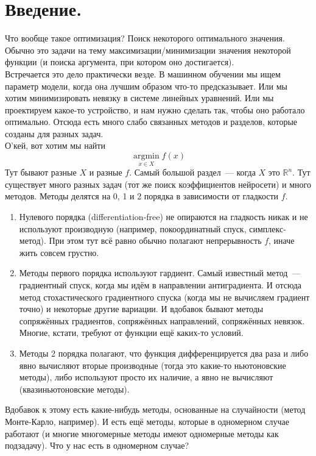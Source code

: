 \documentclass{article}
\begin{document}
    \section{Введение.}
    Что вообще такое оптимизация? Поиск некоторого оптимального значения. Обычно это задачи на тему максимизации/минимизации значения некоторой функции (и поиска аргумента, при котором оно достигается).\\
    Встречается это дело практически везде. В машинном обучении мы ищем параметр модели, когда она лучшим образом что-то предсказывает. Или мы хотим минимизировать невязку в системе линейных уравнений. Или мы проектируем какое-то устройство, и нам нужно сделать так, чтобы оно работало оптимально. Отсюда есть много слабо связанных методов и разделов, которые созданы для разных задач.\\
    О'кей, вот хотим мы найти
    $$
    \operatorname*{argmin}_{x\in X}f(x)
    $$
    Тут бывают разные $X$ и разные $f$. Самый большой раздел~--- когда $X$ это $\mathbb R^n$. Тут существует много разных задач (тот же поиск коэффициентов нейросети) и много методов. Методы делятся на 0, 1 и 2 порядка в зависимости от гладкости $f$.
    \begin{enumerate}[1.]
        \addtocounter{enumi}{-1}
        \item Нулевого порядка (differentiation-free) не опираются на гладкость никак и не используют производную (например, покоординатный спуск, симплекс-метод). При этом тут всё равно обычно полагают непрерывность $f$, иначе жить совсем грустно.
        \item Методы первого порядка используют гардиент. Самый известный метод~--- градиентный спуск, когда мы идём в направлении антиградиента. И отсюда метод стохастического градиентного спуска (когда мы не вычисляем градиент точно) и некоторые другие вариации. И вдобавок бывают методы сопряжённых градиентов, сопряжённых направлений, сопряжённых невязок. Многие, кстати, требуют от функции ещё каких-то условий.
        \item Методы 2 порядка полагают, что функция дифференцируется два раза и либо явно вычисляют вторые производные (тогда это какие-то ньютоновские методы), либо используют просто их наличие, а явно не вычисляют (квазиньютоновские методы).
    \end{enumerate}
    Вдобавок к этому есть какие-нибудь методы, основанные на случайности (метод Монте-Карло, например). И есть ещё методы, которые в одномерном случае работают (и многие многомерные методы имеют одномерные методы как подзадачу). Что у нас есть в одномерном случае?
\end{document}
